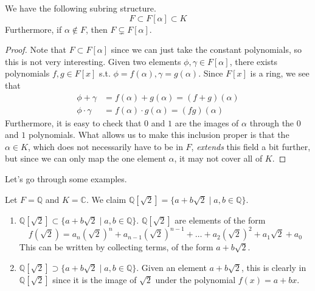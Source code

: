   \begin{lemma} 
    We have the following subring structure. 
    \begin{equation}
      F \subset F[\alpha] \subset K
    \end{equation}
    Furthermore, if $\alpha \not\in F$, then $F \subsetneq F[\alpha]$. 
  \end{lemma}
  \begin{proof}
    Note that $F \subset F[\alpha]$ since we can just take the constant polynomials, so this is not very interesting. Given two elements $\phi, \gamma \in F[\alpha]$, there exists polynomials $f, g \in F[x]$ s.t. $\phi = f(\alpha), \gamma = g(\alpha)$. Since $F[x]$ is a ring, we see that 
    \begin{align}
      \phi + \gamma & = f(\alpha) + g(\alpha) = (f + g)(\alpha) \\
      \phi \cdot \gamma & = f(\alpha) \cdot g(\alpha) = (fg)(\alpha)
    \end{align} 
    Furthermore, it is easy to check that $0$ and $1$ are the images of $\alpha$ through the $0$ and $1$ polynomials. What allows us to make this inclusion proper is that the $\alpha \in K$, which does not necessarily have to be in $F$, \textit{extends} this field a bit further, but since we can only map the one element $\alpha$, it may not cover all of $K$. 
  \end{proof} 

  Let's go through some examples. 

  \begin{example}
    Let $F = \mathbb{Q}$ and $K = \mathbb{C}$. We claim $\mathbb{Q}[\sqrt{2}] = \{a + b \sqrt{2} \mid a, b \in \mathbb{Q} \}$.
    \begin{enumerate}
      \item $\mathbb{Q}[\sqrt{2}] \subset \{a + b \sqrt{2} \mid a, b \in \mathbb{Q} \}$. $\mathbb{Q}[\sqrt{2}]$ are elements of the form
      \begin{equation}
        f(\sqrt{2}) = a_n (\sqrt{2})^n + a_{n-1} (\sqrt{2})^{n-1} + \ldots + a_2 (\sqrt{2})^2 + a_1 \sqrt{2} + a_0
      \end{equation} 
      This can be written by collecting terms, of the form $a + b \sqrt{2}$. 

      \item $\mathbb{Q}[\sqrt{2}] \supset \{a + b \sqrt{2} \mid a, b \in \mathbb{Q} \}$. Given an element $a + b \sqrt{2}$, this is clearly in $\mathbb{Q}[\sqrt{2}]$ since it is the image of $\sqrt{2}$ under the polynomial $f(x) = a + bx$. 
    \end{enumerate}
  \end{example} 

